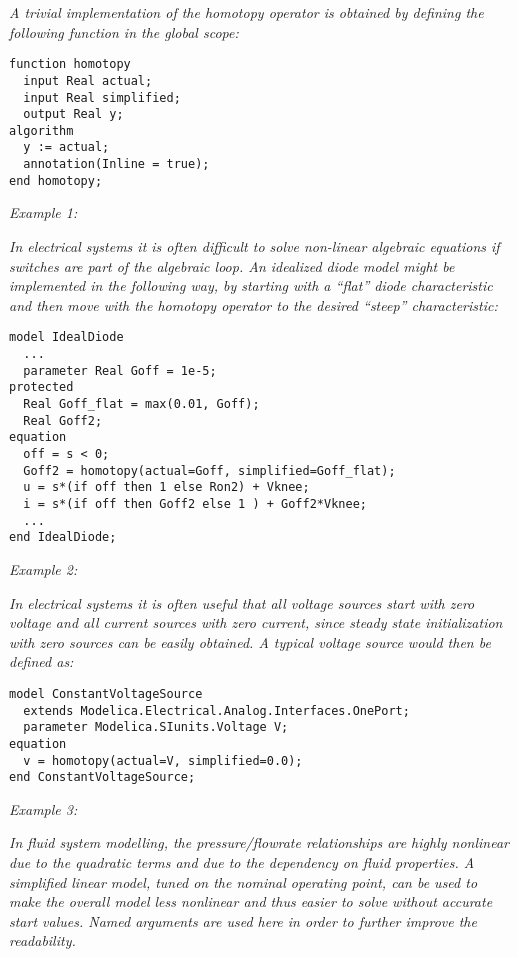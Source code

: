\emph{A trivial implementation of the homotopy operator is obtained by
defining the following function in the global scope:}

\begin{lstlisting}[language=modelica]
function homotopy
  input Real actual;
  input Real simplified;
  output Real y;
algorithm
  y := actual;
  annotation(Inline = true);
end homotopy;
\end{lstlisting}

\emph{Example 1:}

\emph{In electrical systems it is often difficult to solve non-linear
algebraic equations if switches are part of the algebraic loop. An
idealized diode model might be implemented in the following way, by
starting with a ``flat'' diode characteristic and then move with the
homotopy operator to the desired ``steep'' characteristic:}

\begin{lstlisting}[language=modelica]
model IdealDiode
  ...
  parameter Real Goff = 1e-5;
protected
  Real Goff_flat = max(0.01, Goff);
  Real Goff2;
equation
  off = s < 0;
  Goff2 = homotopy(actual=Goff, simplified=Goff_flat);
  u = s*(if off then 1 else Ron2) + Vknee;
  i = s*(if off then Goff2 else 1 ) + Goff2*Vknee;
  ...
end IdealDiode;
\end{lstlisting}

\emph{Example 2:}

\emph{In electrical systems it is often useful that all voltage sources
start with zero voltage and all current sources with zero current, since
steady state initialization with zero sources can be easily obtained. A
typical voltage source would then be defined as:}

\begin{lstlisting}[language=modelica]
model ConstantVoltageSource
  extends Modelica.Electrical.Analog.Interfaces.OnePort; 
  parameter Modelica.SIunits.Voltage V;
equation
  v = homotopy(actual=V, simplified=0.0);
end ConstantVoltageSource;
\end{lstlisting}

\emph{Example 3:}

\emph{In fluid system modelling, the pressure/flowrate relationships are
highly nonlinear due to the quadratic terms and due to the dependency on
fluid properties. A simplified linear model, tuned on the nominal
operating point, can be used to make the overall model less nonlinear
and thus easier to solve without accurate start values. Named arguments
are used here in order to further improve the readability.}

